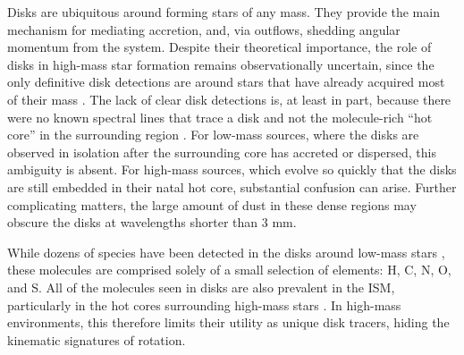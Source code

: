 \documentclass[12pt]{article}
\begin{document}

Disks are ubiquitous around forming stars of any mass.  They provide the main
mechanism for mediating accretion, and, via outflows, shedding angular momentum
from the system.  Despite their theoretical importance, the role of disks in
high-mass star formation remains observationally uncertain, since the only
definitive disk detections are around stars that have already acquired most of
their mass \cite{Girart2017a,Ginsburg2018b}.  The lack of clear disk detections
is, at least in part, because there were no known spectral lines that trace a
disk and not the molecule-rich ``hot core'' in the surrounding region
\cite{Goddi2018a,Cesaroni2017a}.  For low-mass sources, where the disks are
observed in isolation after the surrounding core has accreted or dispersed,
this ambiguity is absent.  For high-mass sources, which evolve so quickly that
the disks are still embedded in their natal hot core, substantial confusion can
arise.  Further complicating matters, the large amount of dust in these dense
regions may obscure the disks at wavelengths shorter than 3 mm.

While dozens of species have been detected in the disks around low-mass stars
\cite{McGuire2018c}, these molecules are comprised solely of a small selection
of elements: H, C, N, O, and S.  All of the molecules seen in disks are also
prevalent in the ISM, particularly in the hot cores surrounding high-mass stars
\cite{Nummelin1998a,Belloche2013a}. In high-mass environments, this therefore limits
their utility as unique disk tracers, hiding the kinematic
signatures of rotation.
\end{document}
